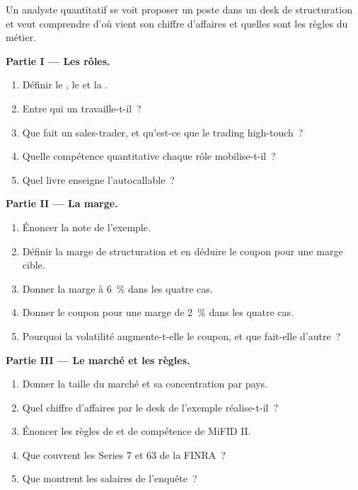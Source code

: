 \begin{problem}\label{pb:in:structurer-sales-and-sales-trader:1}
Un analyste quantitatif se voit proposer un poste dans un desk de structuration et veut comprendre d'où vient son chiffre d'affaires
et quelles sont les règles du métier.

\medskip\noindent\textbf{Partie I --- Les rôles.}
\begin{enumerate}
\item Définir le , le  et la .
\item Entre qui un  travaille-t-il~?
\item Que fait un sales-trader, et qu'est-ce que le trading high-touch~?
\item Quelle compétence quantitative chaque rôle mobilise-t-il~?
\item Quel livre enseigne l'autocallable~?
\end{enumerate}

\medskip\noindent\textbf{Partie II --- La marge.}
\begin{enumerate}[resume]
\item Énoncer la note de l'exemple.
\item Définir la marge de structuration et en déduire le coupon pour une marge cible.
\item Donner la marge à 6~\% dans les quatre cas.
\item Donner le coupon pour une marge de 2~\% dans les quatre cas.
\item Pourquoi la volatilité augmente-t-elle le coupon, et que fait-elle d'autre~?
\end{enumerate}

\medskip\noindent\textbf{Partie III --- Le marché et les règles.}
\begin{enumerate}[resume]
\item Donner la taille du marché et sa concentration par pays.
\item Quel chiffre d'affaires par  le desk de l'exemple réalise-t-il~?
\item Énoncer les règles de  et de compétence de MiFID II.
\item Que couvrent les Series 7 et 63 de la FINRA~?
\item Que montrent les salaires de l'enquête~?
\end{enumerate}


\end{problem}
